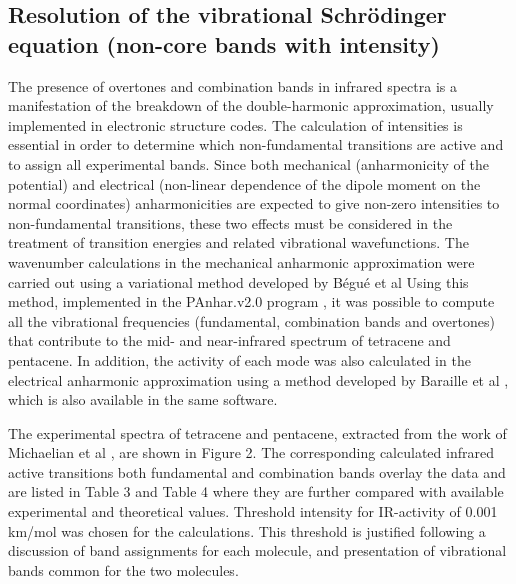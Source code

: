 \singlespacing
\subsection{Resolution of the vibrational Schrödinger equation (non-core bands with intensity)}


 The presence of overtones and combination bands in infrared spectra is a manifestation of the breakdown of the double-harmonic approximation, usually implemented in electronic structure codes. The calculation of intensities is essential in order to determine which non-fundamental transitions are active and to assign all experimental bands. Since both mechanical (anharmonicity of the potential) and electrical (non-linear dependence of the dipole moment on the normal coordinates) anharmonicities are expected to give non-zero intensities to non-fundamental transitions, these two effects must be considered in the treatment of transition energies and related vibrational wavefunctions. The wavenumber calculations in the mechanical anharmonic approximation were carried out using a variational method developed by Bégué et al \cite{begue2007comparison} Using this method, implemented in the P\textunderscore Anhar.v2.0 program \cite{gohaud2005new},  it was possible to compute all the vibrational frequencies (fundamental, combination bands and overtones) that contribute to the mid- and near-infrared spectrum of tetracene and pentacene. In addition, the activity of each mode was also calculated in the electrical anharmonic approximation using a method developed by Baraille et al \cite{begue2010calculation,baraille2001calculation} , which is also available in the same software.

The experimental spectra of tetracene and pentacene, extracted from the work of Michaelian et al \cite{michaelian2012far} , are shown in Figure 2. The corresponding calculated infrared active transitions both fundamental and combination bands overlay the data and are listed in Table 3 and Table 4 where they are further compared with available experimental and theoretical values. Threshold intensity for IR-activity of 0.001 km/mol was chosen for the calculations. This threshold is justified following a discussion of band assignments for each molecule, and presentation of vibrational bands common for the two molecules.

